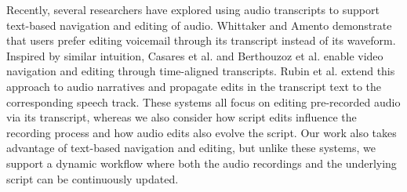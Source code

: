 Recently, several researchers have explored using audio transcripts to support text-based navigation and editing of audio. Whittaker and Amento \cite{whittaker2004semantic} demonstrate that users prefer editing voicemail through its transcript instead of its waveform. Inspired by similar intuition, Casares et al. \cite{casares2002simplifying} and Berthouzoz et al. \cite{berthouzoz2012tools} enable video navigation and editing through time-aligned transcripts. Rubin et al. \cite{rubin2013content} extend this approach to audio narratives and propagate edits in the transcript text to the corresponding speech track. These systems all focus on editing pre-recorded audio via its transcript, whereas we also consider how script
edits influence the recording process and how audio edits
also evolve the script. 
 \cite{rubin2015capture} 
Our work also takes advantage of text-based navigation and editing, but unlike these systems, we support a dynamic workflow where both the audio recordings and the underlying script can be continuously  updated.      

